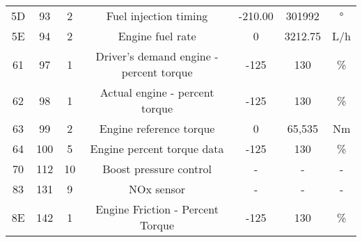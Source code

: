 \begin{table}[]
\begin{tabular}{ccccccc}
5D                                        & 93                                       & 2                                                   & Fuel injection timing                       & -210.00                                   & 301992                                    & °                                     \\
5E                                        & 94                                       & 2                                                   & Engine fuel rate                            & 0                                         & 3212.75                                   & L/h                                   \\
61                                        & 97                                       & 1                                                   & Driver's demand engine - percent torque     & -125                                      & 130                                       & \%                                    \\
62                                        & 98                                       & 1                                                   & Actual engine - percent torque              & -125                                      & 130                                       & \%                                    \\
63                                        & 99                                       & 2                                                   & Engine reference torque                     & 0                                         & 65,535                                    & Nm                                    \\
64                                        & 100                                      & 5                                                   & Engine percent torque data                  & -125                                      & 130                                       & \%                                    \\
70                                        & 112                                      & 10                                                  & Boost pressure control                      & -                                         & -                                         & -                                     \\
83                                        & 131                                      & 9                                                   & NOx sensor                                  & -                                         & -                                         & -                                     \\
8E                                        & 142                                      & 1                                                   & Engine Friction - Percent Torque            & -125                                      & 130                                       & \%                                   
\end{tabular}
\end{table}